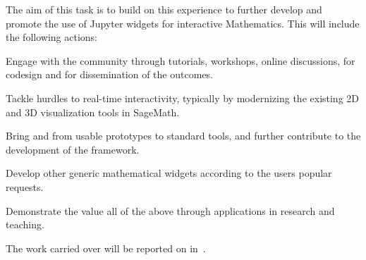 \begin{task}[
  title=Demonstrator: Interactive Mathematics with Jupyter Widgets,
  id=math,
  lead=UPSUD,
  PM=17, %
  wphases={0-36},
  partners={EGI,EP,QS}
  ]

  The aim of this task is to build on this experience to further
  develop and promote the use of Jupyter widgets for interactive
  Mathematics. This will include the following actions:
  \begin{compactitem}
  \item Engage with the community through tutorials, workshops, online
    discussions, for codesign and for dissemination of the outcomes.
  \item Tackle hurdles to real-time interactivity, typically by
    modernizing the existing 2D and 3D visualization tools in
    SageMath. %
  \item Bring  and
     from usable prototypes to standard tools,
    and further contribute to the development of the 
    framework.
  \item Develop other generic mathematical widgets according to the
    users popular requests.
  \item Demonstrate the value all of the above through applications in
    research and teaching.
  \end{compactitem}
  The work carried over will be reported on in~.
\end{task}
